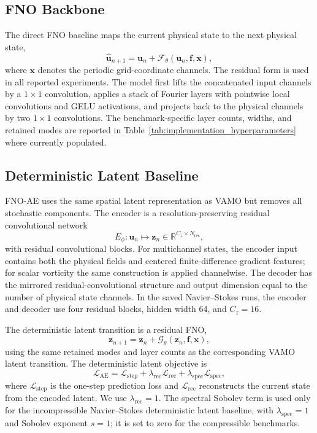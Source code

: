 \documentclass[11pt]{article}
\begin{document}
\subsection{FNO Backbone}
The direct FNO baseline maps the current physical state to the next physical
state,
\[
    \widehat{\mathbf u}_{n+1}
    =
    \mathbf u_n+\mathcal F_\theta(\mathbf u_n,\mathbf f,\mathbf x),
\]
where $\mathbf x$ denotes the periodic grid-coordinate channels. The residual
form is used in all reported experiments. The model first lifts the concatenated
input channels by a $1\times1$ convolution, applies a stack of Fourier layers
with pointwise local convolutions and GELU activations, and projects back to the
physical channels by two $1\times1$ convolutions. The benchmark-specific layer
counts, widths, and retained modes are reported in
Table~\ref{tab:implementation_hyperparameters} where currently populated.

\subsection{Deterministic Latent Baseline}
FNO-AE uses the same spatial latent representation as VAMO but removes all
stochastic components. The encoder is a resolution-preserving residual
convolutional network
\[
    E_\phi:\mathbf u_n\mapsto \mathbf z_n
    \in\mathbb R^{C_z\times N_{\mathrm{res}}},
\]
with residual convolutional blocks. For multichannel states, the encoder input
contains both the physical fields and centered finite-difference gradient
features; for scalar vorticity the same construction is applied channelwise. The
decoder has the mirrored residual-convolutional structure and output dimension
equal to the number of physical state channels. In the saved Navier--Stokes
runs, the encoder and decoder use four residual blocks, hidden width 64, and
$C_z=16$.

The deterministic latent transition is a residual FNO,
\[
    \mathbf z_{n+1}
    =
    \mathbf z_n+\mathcal G_\theta(\mathbf z_n,\mathbf f,\mathbf x),
\]
using the same retained modes and layer counts as the corresponding VAMO latent
transition. The deterministic latent objective is
\[
    \mathcal L_{\mathrm{AE}}
    =
    \mathcal L_{\mathrm{step}}
    +\lambda_{\mathrm{rec}}\mathcal L_{\mathrm{rec}}
    +\lambda_{\mathrm{spec}}\mathcal L_{\mathrm{spec}},
\]
where $\mathcal L_{\mathrm{step}}$ is the one-step prediction loss and
$\mathcal L_{\mathrm{rec}}$ reconstructs the current state from the encoded
latent. We use $\lambda_{\mathrm{rec}}=1$. The spectral Sobolev term is used
only for the incompressible Navier--Stokes deterministic latent baseline, with
$\lambda_{\mathrm{spec}}=1$ and Sobolev exponent $s=1$; it is set to zero for
the compressible benchmarks.
\end{document}

